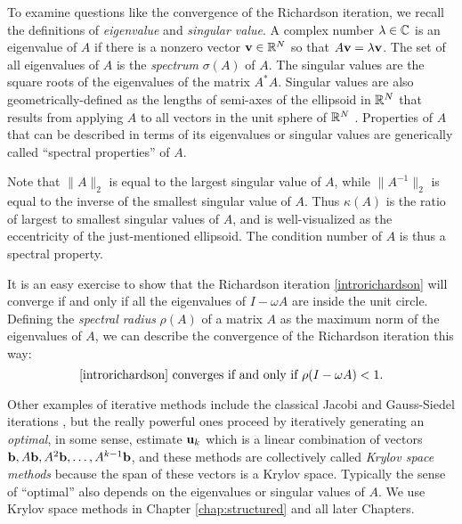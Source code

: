 To examine questions like the convergence of the Richardson iteration, we recall the definitions of \emph{eigenvalue} and \emph{singular value}.  A complex number $\lambda \in \mathbb{C}$ is an eigenvalue of $A$ if there is a nonzero vector $\mathbf{v}\in\mathbb{R}^N$ so that $A \mathbf{v} = \lambda \mathbf{v}$.  The set of all eigenvalues of $A$ is the \emph{spectrum} $\sigma(A)$ of $A$.  The singular values are the square roots of the eigenvalues of the matrix $A^*A$.  Singular values are also geometrically-defined as the lengths of semi-axes of the ellipsoid in $\mathbb{R}^N$ that results from applying $A$ to all vectors in the unit sphere of $\mathbb{R}^N$ \citep{TrefethenBau}.  Properties of $A$ that can be described in terms of its eigenvalues or singular values are generically called ``spectral properties'' of $A$.

Note that $\|A\|_2$ is equal to the largest singular value of $A$, while $\|A^{-1}\|_2$ is equal to the inverse of the smallest singular value of $A$.  Thus $\kappa(A)$ is the ratio of largest to smallest singular values of $A$, and is well-visualized as the eccentricity of the just-mentioned ellipsoid.  The condition number of $A$ is thus a spectral property.

It is an easy exercise to show that the Richardson iteration \eqref{introrichardson} will converge if and only if all the eigenvalues of $I-\omega A$ are inside the unit circle.  Defining the \emph{spectral radius} $\rho(A)$ of a matrix $A$ as the maximum norm of the eigenvalues of $A$, we can describe the convergence of the Richardson iteration this way:
\begin{equation}
\text{\eqref{introrichardson} converges if and only if } \rho(I-\omega A) < 1. \label{introconvergethm}
\end{equation}

Other examples of iterative methods include the classical Jacobi and Gauss-Siedel iterations \citep{Greenbaum1997}, but the really powerful ones proceed by iteratively generating an \emph{optimal}, in some sense, estimate $\mathbf{u}_k$ which is a linear combination of vectors $\mathbf{b},A\mathbf{b},A^2\mathbf{b},\dots,A^{k-1}\mathbf{b}$, and these methods are collectively called \emph{Krylov space methods} because the span of these vectors is a Krylov space.  Typically the sense of ``optimal'' also depends on the eigenvalues or singular values of $A$.  We use Krylov space methods in Chapter \ref{chap:structured} and all later Chapters.

